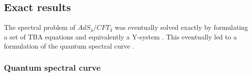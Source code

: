 \label{eq:short}

\subsection{Exact results}
\label{sec:abjm_exact}

The spectral problem of $AdS_4/CFT_3$ was eventually solved exactly by formulating a set of TBA equations \cite{Gromov:2009tv} and equivalently a Y-system \cite{Bombardelli:2009xz,Gromov:2009at}.
This eventually led to a formulation of the quantum spectral curve \cite{Cavaglia:2014exa}.

\subsubsection{Quantum spectral curve}

